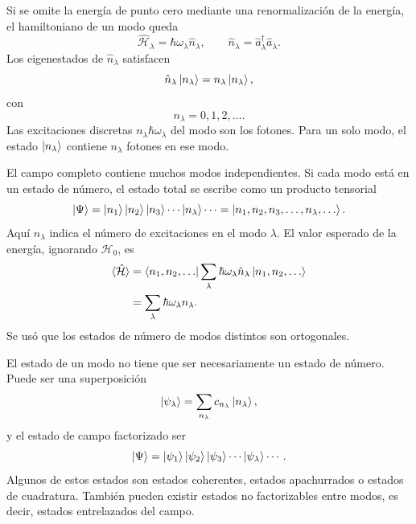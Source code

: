 \documentclass[11pt]{article}
\begin{document}
Si se omite la energ\'ia de punto cero mediante una renormalizaci\'on de la
energ\'ia, el hamiltoniano de un modo queda
\begin{equation}
  \hat{\mathcal H}_\lambda
  =
  \hbar\omega_\lambda\hat n_\lambda,
  \qquad
  \hat n_\lambda
  =
  \hat a_\lambda^\dagger\hat a_\lambda.
\end{equation}
Los eigenestados de $\hat n_\lambda$ satisfacen
\begin{equation}
  \hat n_\lambda\ket{n_\lambda}
  =
  n_\lambda\ket{n_\lambda},
\end{equation}
con
\begin{equation}
  n_\lambda=0,1,2,\ldots.
\end{equation}
Las excitaciones discretas $n_\lambda\hbar\omega_\lambda$ del modo son los
fotones. Para un solo modo, el estado $\ket{n_\lambda}$ contiene
$n_\lambda$ fotones en ese modo.

El campo completo contiene muchos modos independientes. Si cada modo est\'a
en un estado de n\'umero, el estado total se escribe como un producto tensorial
\begin{equation}
  \ket{\Psi}
  =
  \ket{n_1}\ket{n_2}\ket{n_3}\cdots\ket{n_\lambda}\cdots
  =
  \ket{n_1,n_2,n_3,\ldots,n_\lambda,\ldots}.
\end{equation}
Aqu\'i $n_\lambda$ indica el n\'umero de excitaciones en el modo $\lambda$.
El valor esperado de la energ\'ia, ignorando $\mathcal H_0$, es
\begin{align}
  \braket{\hat{\mathcal H}}
  &=
  \bra{n_1,n_2,\ldots}
  \sum_\lambda
  \hbar\omega_\lambda\hat n_\lambda
  \ket{n_1,n_2,\ldots}\\
  &=
  \sum_\lambda
  \hbar\omega_\lambda
  n_\lambda.
\end{align}
Se us\'o que los estados de n\'umero de modos distintos son ortogonales.

El estado de un modo no tiene que ser necesariamente un estado de n\'umero.
Puede ser una superposici\'on
\begin{equation}
  \ket{\psi_\lambda}
  =
  \sum_{n_\lambda}
  c_{n_\lambda}\ket{n_\lambda},
\end{equation}
y el estado de campo factorizado ser
\begin{equation}
  \ket{\Psi}
  =
  \ket{\psi_1}\ket{\psi_2}\ket{\psi_3}\cdots\ket{\psi_\lambda}\cdots.
\end{equation}
Algunos de estos estados son estados coherentes, estados apachurrados o
estados de cuadratura. Tambi\'en pueden existir estados no factorizables entre
modos, es decir, estados entrelazados del campo.
\end{document}
